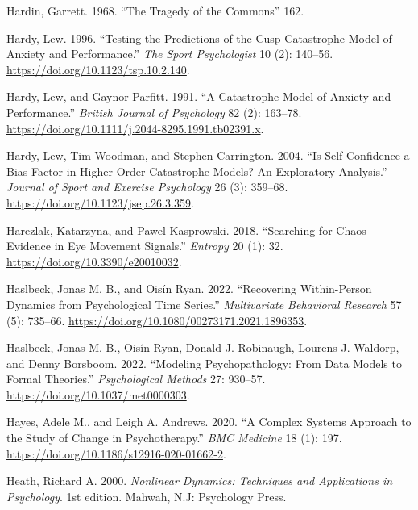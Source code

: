 \documentclass[
  letterpaper,
]{scrbook}
\newlength{\cslhangindent}
\newlength{\cslentryspacingunit} %
\newenvironment{CSLReferences}[2] %
 {%
  \setlength{\parindent}{0pt}
  \ifodd #1
  \let\oldpar\par
  \def\par{\hangindent=\cslhangindent\oldpar}
  \fi
  \setlength{\parskip}{#2\cslentryspacingunit}
 }%
 {}
\begin{document}
\begin{CSLReferences}{1}{0}
\leavevmode{}%
Hardin, Garrett. 1968. {``The {Tragedy} of the {Commons}''} 162.

\leavevmode{}%
Hardy, Lew. 1996. {``Testing the {Predictions} of the {Cusp Catastrophe
Model} of {Anxiety} and {Performance}.''} \emph{The Sport Psychologist}
10 (2): 140--56. \url{https://doi.org/10.1123/tsp.10.2.140}.

\leavevmode{}%
Hardy, Lew, and Gaynor Parfitt. 1991. {``A Catastrophe Model of Anxiety
and Performance.''} \emph{British Journal of Psychology} 82 (2):
163--78. \url{https://doi.org/10.1111/j.2044-8295.1991.tb02391.x}.

\leavevmode{}%
Hardy, Lew, Tim Woodman, and Stephen Carrington. 2004. {``Is
Self-Confidence a Bias Factor in Higher-Order Catastrophe Models? An
Exploratory Analysis.''} \emph{Journal of Sport and Exercise Psychology}
26 (3): 359--68. \url{https://doi.org/10.1123/jsep.26.3.359}.

\leavevmode{}%
Harezlak, Katarzyna, and Pawel Kasprowski. 2018. {``Searching for Chaos
Evidence in Eye Movement Signals.''} \emph{Entropy} 20 (1): 32.
\url{https://doi.org/10.3390/e20010032}.

\leavevmode{}%
Haslbeck, Jonas M. B., and Oisín Ryan. 2022. {``Recovering
{Within-Person Dynamics} from {Psychological Time Series}.''}
\emph{Multivariate Behavioral Research} 57 (5): 735--66.
\url{https://doi.org/10.1080/00273171.2021.1896353}.

\leavevmode{}%
Haslbeck, Jonas M. B., Oisín Ryan, Donald J. Robinaugh, Lourens J.
Waldorp, and Denny Borsboom. 2022. {``Modeling Psychopathology: {From}
Data Models to Formal Theories.''} \emph{Psychological Methods} 27:
930--57. \url{https://doi.org/10.1037/met0000303}.

\leavevmode{}%
Hayes, Adele M., and Leigh A. Andrews. 2020. {``A Complex Systems
Approach to the Study of Change in Psychotherapy.''} \emph{BMC Medicine}
18 (1): 197. \url{https://doi.org/10.1186/s12916-020-01662-2}.

\leavevmode{}%
Heath, Richard A. 2000. \emph{Nonlinear {Dynamics}: {Techniques} and
{Applications} in {Psychology}}. 1st edition. {Mahwah, N.J}: {Psychology
Press}.


\end{CSLReferences}
\end{document}
